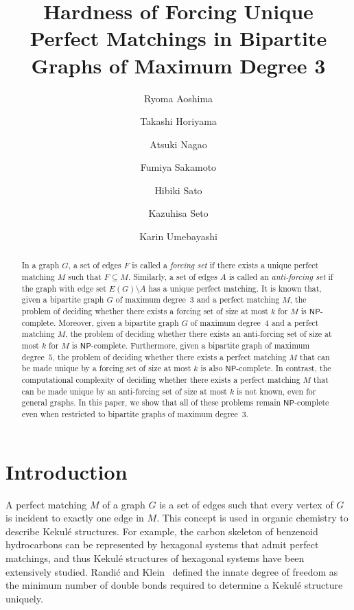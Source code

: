 \documentclass[a4paper,10pt]{article}
\newcommand{\NPc}{$\mathsf{NP}$-complete}
\begin{document}
\title{Hardness of Forcing Unique Perfect Matchings in Bipartite Graphs of Maximum Degree 3}
\author[1]{Ryoma Aoshima}
\author[1]{Takashi Horiyama}
\author[2]{Atsuki Nagao}
\author[1]{Fumiya Sakamoto}
\author[2]{Hibiki Sato}
\author[1]{Kazuhisa Seto}
\author[2]{Karin Umebayashi}
\date{}


\maketitle


\begin{abstract}
In a graph $G$, a set of edges $F$ is called a \emph{forcing set} if there exists a unique perfect matching $M$ such that $F \subseteq M$.
Similarly, a set of edges $A$ is called an \emph{anti-forcing set} if the graph with edge set $ E(G)\setminus A$ has a unique perfect matching.
It is known that, given a bipartite graph $G$ of maximum degree~$3$ and a perfect matching $M$, the problem of deciding whether there exists a forcing set of size at most $k$ for $M$ is {\NPc}.
Moreover, given a bipartite graph $G$ of maximum degree~$4$ and a perfect matching $M$, the problem of deciding whether there exists an anti-forcing set of size at most $k$ for $M$ is {\NPc}.
Furthermore, given a bipartite graph of maximum degree~$5$, the problem of deciding whether there exists a perfect matching $M$ that can be made unique by a forcing set of size at most $k$ is also {\NPc}.
In contrast, the computational complexity of deciding whether there exists a perfect matching $M$ that can be made unique by an anti-forcing set of size at most $k$ is not known, even for general graphs.
In this paper, we show that all of these problems remain {\NPc} even when restricted to bipartite graphs of maximum degree~$3$.
\end{abstract}

\section{Introduction}
A perfect matching $M$ of a graph $G$ is a set of edges such that every vertex of $G$ is incident to exactly one edge in $M$.
This concept is used in organic chemistry to describe Kekul\'{e} structures.
For example, the carbon skeleton of benzenoid hydrocarbons can be represented by hexagonal systems that admit perfect matchings, and thus Kekul\'{e} structures of hexagonal systems have been extensively studied.
Randi\'{c} and Klein~\cite{randic1985kekule} defined the innate degree of freedom as the minimum number of double bonds required to determine a Kekul\'{e} structure uniquely.
\end{document}
